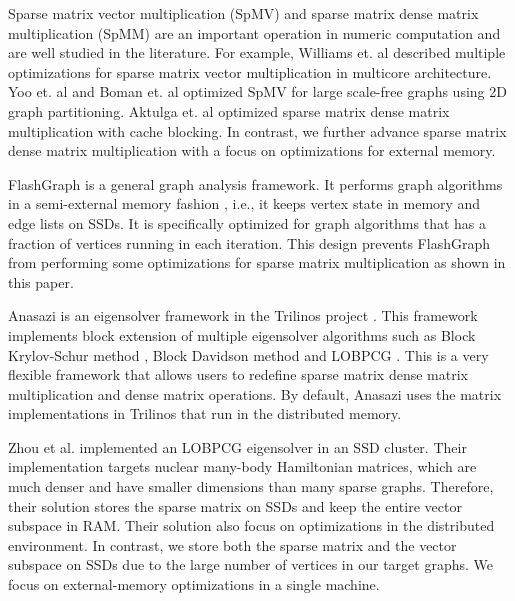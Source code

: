 Sparse matrix vector multiplication (SpMV) and sparse matrix dense matrix
multiplication (SpMM) are an important operation in numeric computation and
are well studied in the literature. For example, Williams et. al
\cite{Williams07} described multiple optimizations for sparse matrix
vector multiplication in multicore architecture. Yoo et. al \cite{Yoo11}
and Boman et. al \cite{Boman2013} optimized SpMV for large scale-free graphs
using 2D graph partitioning. Aktulga et. al \cite{Aktulga14} optimized sparse
matrix dense matrix multiplication with cache blocking. In contrast, we
further advance sparse matrix dense matrix multiplication with a focus on
optimizations for external memory.

FlashGraph \cite{flashgraph} is a general graph analysis framework. It performs
graph algorithms in a semi-external memory fashion \cite{Abello98}, i.e., it keeps
vertex state in memory and edge lists on SSDs. It is specifically optimized for
graph algorithms that has a fraction of vertices running in each iteration.
This design prevents FlashGraph from performing some optimizations for sparse
matrix multiplication as shown in this paper.

Anasazi \cite{anasazi} is an eigensolver framework in the Trilinos project
\cite{trilinos}. This framework implements block extension of multiple
eigensolver algorithms
such as Block Krylov-Schur method \cite{krylovschur}, Block Davidson method
\cite{Arbenz05} and LOBPCG \cite{Arbenz05}. This is a very flexible framework
that allows users to redefine sparse matrix dense matrix multiplication and
dense matrix operations. By default, Anasazi uses the matrix implementations
in Trilinos that run in the distributed memory.

Zhou et al. \cite{Zhou12} implemented an LOBPCG \cite{Arbenz05} eigensolver in
an SSD cluster. Their implementation targets nuclear many-body Hamiltonian
matrices, which are much denser and have smaller dimensions than many sparse
graphs. Therefore, their solution stores the sparse matrix on SSDs and keep
the entire vector subspace in RAM. Their solution also focus on optimizations
in the distributed environment. In contrast, we store both the sparse matrix
and the vector subspace on SSDs due to the large number of vertices in
our target graphs. We focus on external-memory optimizations in a single machine.
